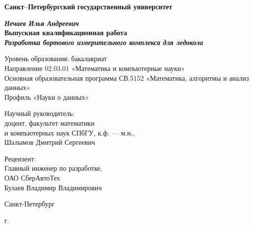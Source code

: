 
\begin{titlepage}
\begin{center}

\textbf{Санкт--Петербургский}
\textbf{государственный университет}

\vspace{35mm}

\textbf{\textit{\large Нечаев Илья Андреевич}} \\[8mm]
\textbf{\large Выпускная квалификационная работа}\\[3mm]
\textbf{\textit{\large Разработка бортового измерительного комплекса для ледокола}}

\vspace{20mm}
Уровень образования: бакалавриат\\
Направление 02.03.01 «Математика и компьютерные науки»\\
Основная образовательная программа СВ.5152 «Математика, алгоритмы и
анализ данных»\\
Профиль «Науки о данных»\\[25mm]


\begin{flushright}
\begin{minipage}[t]{0.65\textwidth}
{Научный руководитель:} \\
доцент,
факультет математики \\
и компьютерных наук СПбГУ,
к.ф. --- м.н., \\
Шалымов Дмитрий Сергеевич

\vspace{10mm}

{Рецензент:} \\
Главный инженер по разработке, \\ОАО СберАвтоТех \\ Булаев Владимир Владимирович
\end{minipage}
\end{flushright}

\vfill 

{Санкт-Петербург}
\par{\the\year{} г.}
\end{center}
\end{titlepage}
\restoregeometry{}
\addtocounter{page}{1}